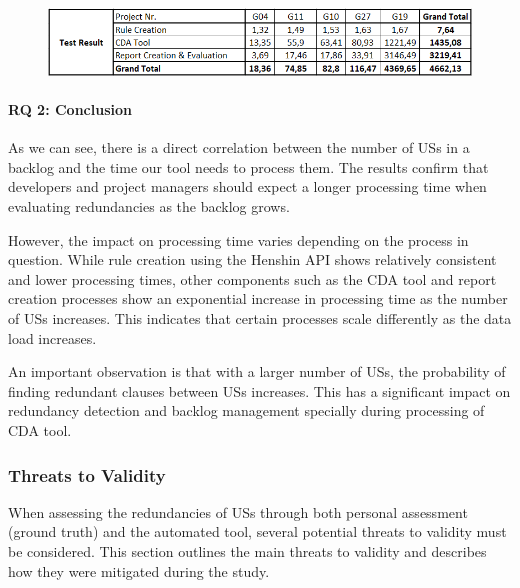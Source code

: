 	\begin{figure}[h]
	\begingroup
	\scriptsize
	\centering
	\includegraphics[scale=0.7]{Table/performance_result.png}
	\label{tb:performance_result}
	\endgroup
\end{figure}
\paragraph{RQ 2: Conclusion}As we can see, there is a direct correlation between the number of USs in a backlog and the time our tool needs to process them. The results confirm that developers and project managers should expect a longer processing time when evaluating redundancies as the backlog grows.

However, the impact on processing time varies depending on the process in question. While rule creation using the Henshin API shows relatively consistent and lower processing times, other components such as the CDA tool and report creation processes show an exponential increase in processing time as the number of USs increases. This indicates that certain processes scale differently as the data load increases.

An important observation is that with a larger number of USs, the probability of finding redundant clauses between USs increases. This has a significant impact on redundancy detection and backlog management specially during processing of CDA tool. %
\subsubsection*{Threats to Validity}
When assessing the redundancies of USs through both personal assessment (ground truth) and the automated tool, several potential threats to validity must be considered. This section outlines the main threats to validity and describes how they were mitigated during the study.
